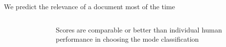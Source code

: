 \documentclass[9pt]{beamer}
\begin{document}
\begin{frame}{We predict the relevance of a document most of the time}
\begin{figure}
\begin{columns}
\begin{column}{0.3812\linewidth}
\begin{figure}
			\end{figure}
		\end{column}
		\begin{column}{0.5\linewidth}
			Scores are comparable or better than individual human performance in choosing the mode classification
			
			\medskip
			

\end{column}
\end{columns}
\end{figure}
\end{frame}
\end{document}
